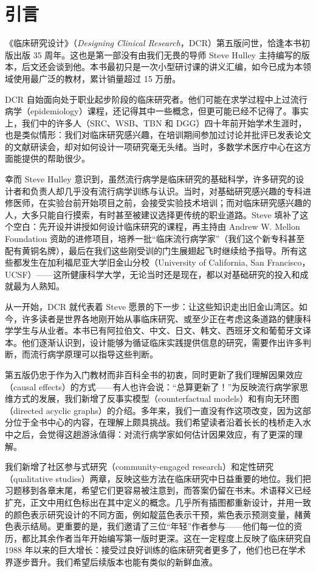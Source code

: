 \chapter*{引言}
《临床研究设计》（\textit{Designing Clinical Research}，DCR）第五版问世，恰逢本书初版出版 35 周年。这也是第一部没有由我们无畏的导师 Steve Hulley 主持编写的版本，后文还会谈到他。本书最初只是一次小型研讨课的讲义汇编，如今已成为本领域使用最广泛的教材，累计销量超过 15 万册。

DCR 自始面向处于职业起步阶段的临床研究者。他们可能在求学过程中上过流行病学（epidemiology）课程，还记得其中一些概念，但更可能已经不记得了。事实上，我们中的许多人（SRC、WSB、TBN 和 DGG）四十年前开始学术生涯时，也是类似情形：我们对临床研究感兴趣，在培训期间参加过讨论并批评已发表论文的文献研读会，却对如何设计一项研究毫无头绪。当时，多数学术医疗中心在这方面能提供的帮助很少。

幸而 Steve Hulley 意识到，虽然流行病学是临床研究的基础科学，许多研究的设计者和负责人却几乎没有流行病学训练与认识。当时，对基础研究感兴趣的专科进修医师，在实验台前开始项目之前，会接受实验技术培训；而对临床研究感兴趣的人，大多只能自行摸索，有时甚至被建议选择更传统的职业道路。Steve 填补了这个空白：先开设并讲授如何设计临床研究的课程，再主持由 Andrew W. Mellon Foundation 资助的进修项目，培养一批“临床流行病学家”（我们这个新专科甚至配有黄铜名牌），最后在我们这些刚受训的门生展翅起飞时继续给予指导。所有这些都发生在加利福尼亚大学旧金山分校（University of California, San Francisco，UCSF）——这所健康科学大学，无论当时还是现在，都以对基础研究的投入和成就最为人熟知。

从一开始，DCR 就代表着 Steve 愿景的下一步：让这些知识走出旧金山湾区。如今，许多读者是世界各地刚开始从事临床研究、或至少正在考虑这条道路的健康科学学生与从业者。本书已有阿拉伯文、中文、日文、韩文、西班牙文和葡萄牙文译本。他们逐渐认识到，设计能够为循证临床实践提供信息的研究，需要作出许多判断，而流行病学原理可以指导这些判断。

第五版仍忠于作为入门教材而非百科全书的初衷，同时更新了我们理解因果效应（causal effects）的方式——有人也许会说：“总算更新了！”为反映流行病学家思维方式的发展，我们新增了反事实模型（counterfactual models）和有向无环图（directed acyclic graphs）的介绍。多年来，我们一直没有作这项改变，因为这部分位于全书中心的内容，在理解上颇具挑战。我们希望读者沿着长长的栈桥走入水中之后，会觉得这趟游泳值得：对流行病学家如何估计因果效应，有了更深的理解。

我们新增了社区参与式研究（community-engaged research）和定性研究（qualitative studies）两章，反映这些方法在临床研究中日益重要的地位。我们把习题移到各章末尾，希望它们更容易被注意到，而答案仍留在书末。术语释义已经扩充，正文中用红色标出在其中定义的概念。几乎所有插图都重新设计，并用一致的颜色表示研究设计的不同方面，例如靛蓝色表示干预，紫色表示预测变量，赭黄色表示结局。更重要的是，我们邀请了三位“年轻”作者参与——他们每一位的资历，都比其余作者当年开始编写第一版时更深。这在一定程度上反映了临床研究自 1988 年以来的巨大增长：接受过良好训练的临床研究者更多了，他们也已在学术界逐步晋升。我们希望后续版本也能有类似的新鲜血液。

